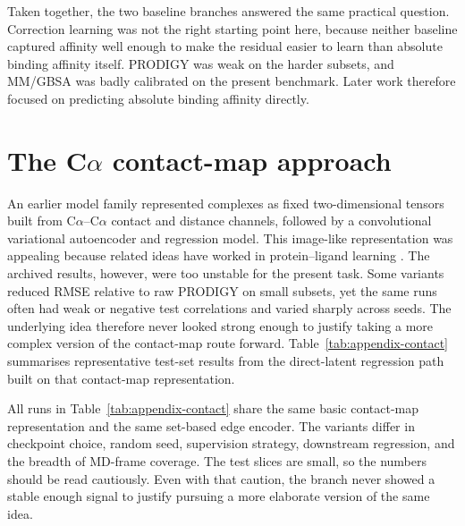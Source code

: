 Taken together, the two baseline branches answered the same practical question. Correction learning was not the right starting point here, because neither baseline captured affinity well enough to make the residual easier to learn than absolute binding affinity itself. PRODIGY was weak on the harder subsets, and MM/GBSA was badly calibrated on the present benchmark. Later work therefore focused on predicting absolute binding affinity directly.

\section{The C\texorpdfstring{$\alpha$}{alpha} contact-map approach}

An earlier model family represented complexes as fixed two-dimensional tensors built from C$\alpha$--C$\alpha$ contact and distance channels, followed by a convolutional variational autoencoder and regression model. This image-like representation was appealing because related ideas have worked in protein--ligand learning \citep{Stepniewska2018Pafnucy}. The archived results, however, were too unstable for the present task. Some variants reduced RMSE relative to raw PRODIGY on small subsets, yet the same runs often had weak or negative test correlations and varied sharply across seeds. The underlying idea therefore never looked strong enough to justify taking a more complex version of the contact-map route forward. Table~\ref{tab:appendix-contact} summarises representative test-set results from the direct-latent regression path built on that contact-map representation.

All runs in Table~\ref{tab:appendix-contact} share the same basic contact-map representation and the same set-based edge encoder. The variants differ in checkpoint choice, random seed, supervision strategy, downstream regression, and the breadth of MD-frame coverage. The test slices are small, so the numbers should be read cautiously. Even with that caution, the branch never showed a stable enough signal to justify pursuing a more elaborate version of the same idea.

